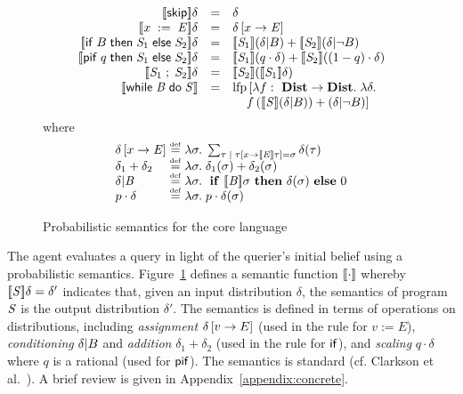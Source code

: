 \begin{figure}
\centering
\begin{displaymath}
\begin{array}{rcl}
\pevalp{\sskip}{\delta} & = & \delta \\
%
\pevalp{\sassign{x}{\aexp}}{\delta} & = & \delta \bparen{x \ra \aexp} \\
%
\pevalp{\sif{B}{\stmt_1}{\stmt_2}}{\delta} & = &
\pevalp{\stmt_1}{(\dcond{\delta}{B})} + \pevalp{\stmt_2}{(\dcond{\delta}{\neg B})} \\
%
\evalp{\spif{q}{\stmt_1}{\stmt_2}}{\delta} & = & 
\evalp{\stmt_1}{(q \cdot\delta)} + \evalp{\stmt_2}{((1-q) \cdot \delta)} \\
%
\pevalp{\sseq{\stmt_1}{\stmt_2}}{\delta} & = & \pevalp{\stmt_2}{\paren{\evalp{\stmt_1}{\delta}}} \\
\pevalp{\swhile{\bexp}{\stmt}}{} & = & \lfp\left[\lambda
f :\ \dists
\rightarrow \dists \lsep \lambda \delta \lsep \right. \\
& & \left. \quad f\paren{\pevalp{\stmt}{(\dcond{\delta}{B})}} +
       \paren{\dcond{\delta}{\neg B}}\right]
\end{array} 
\end{displaymath} 
where
\begin{displaymath}
\begin{array}{l@{\;\defeq\;}l}
\delta \bparen{x \ra \aexp} & \lambda \sigma \lsep \sum_{\tau \; | \; \tau
  \bparen{x \ra \eeval{\aexp}{\tau}} = \sigma} \delta (\tau) \\
\delta_1 + \delta_2 & \lambda \sigma \lsep \delta_1(\sigma) +
\delta_2(\sigma) \\
\dcond{\delta}{\bexp} & \lambda \sigma \lsep \aif \eeval{\bexp}{\sigma} \athen
\delta(\sigma) \aelse 0 \\
p \cdot \delta & \lambda \sigma \lsep p \cdot \delta(\sigma) \\
\end{array}
\end{displaymath}
\vspace*{-.1in}
\caption{Probabilistic semantics for the core language}
\label{fig-sem-nondet2-core}
\end{figure}

The agent evaluates a query in light of the querier's initial belief using a
probabilistic semantics.  Figure~\ref{fig-sem-nondet2-core} defines a
semantic function $[\![{\cdot}]\!]{}$ whereby $[\![{\mathit{S}}]\!]{\delta} =
\delta'$ indicates that, given an input distribution $\delta$, the semantics
of program $\mathit{S}$ is the output distribution $\delta'$.  The semantics is
defined in terms of operations on distributions, including \emph{assignment}
$\delta \left[ v \rightarrow E \right]$ (used in the rule for $v := E$),
\emph{conditioning} $\delta | B$ and \emph{addition} $\delta_1 +
\delta_2$ (used in the rule for $\mathsf{if}$), and \emph{scaling} $q \cdot \delta$
where $q$ is a rational (used for $\mathsf{pif}$).  The semantics is
standard (cf. Clarkson et al.~\cite{clarkson09quantifying}).
\iffull
A brief review is given in Appendix~\ref{appendix:concrete}.
\fi

